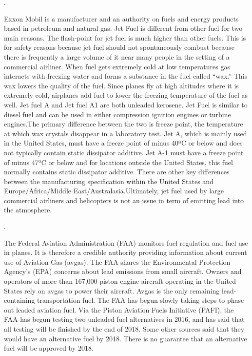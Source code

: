 \documentclass{article}\usepackage[]{graphicx}\usepackage[]{color}
\begin{document}
\bigskip


\noindent {} .

Exxon Mobil is a manufacturer and an authority on fuels and energy products based in petroleum and natural gas. Jet Fuel is different from other fuel for two main reasons. The flash-point for jet fuel is much higher than other fuels. This is for safety reasons because jet fuel should not spontaneously combust because there is frequently a large volume of it near many people in the setting of a commercial airliner. When fuel gets extremely cold at low temperatures gas interacts with freezing water and forms a substance in the fuel called “wax.” This wax lowers the quality of the fuel. Since planes fly at high altitudes where it is extremely cold, airplanes add fuel to lower the freezing temperature of the fuel as well. Jet fuel A and Jet fuel A1 are both unleaded kerosene. Jet Fuel is similar to diesel fuel and can be used in either compression ignition engines or turbine engines.The primary difference between the two is freeze point, the temperature at which wax crystals disappear in a laboratory test. Jet A, which is mainly used in the United States, must have a freeze point of minus 40ºC or below and does not typically contain static dissipator additive. Jet A-1 must have a freeze point of minus 47ºC or below and for locations outside the United States, this fuel normally contains static dissipator additive. There are other key differences between the manufacturing specification within the United States and Europe/Africa/Middle East/Australasia.Ultimately, jet fuel used by large commercial airliners and helicopters  is not an issue in term of emitting lead into the atmosphere.

\bigskip

\noindent {} .

The Federal Aviation Administration (FAA) monitors fuel regulation and fuel use in planes. It is therefore a credible authority providing information about current use of Aviation Gas (avgas). The FAA shares the Environmental Protection Agency's (EPA) concerns about lead emissions from small aircraft. Owners and operators of more than 167,000 piston-engine aircraft operating in the United States rely on avgas to power their aircraft. Avgas is the only remaining lead-containing transportation fuel. The FAA has begun slowly taking steps to phase out leaded aviation fuel. Via the Piston Aviation Fuels Initiative (PAFI), the FAA has begun testing two unleaded fuel alternatives in 2016, and has said that all testing will be finished by the end of 2018. Some other sources said that they would have an alternative fuel by 2018. There is no guarantee that an alternative fuel will be approved by 2018. 
\end{document}
